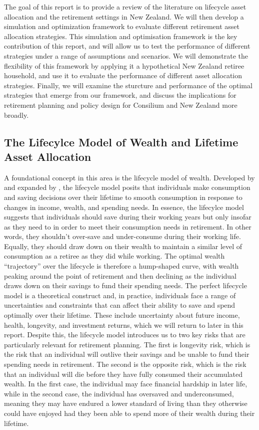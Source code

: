 \documentclass[11pt]{article}
\begin{document}
The goal of this report is to provide a review of the literature on lifecycle asset allocation and the retirement settings in New Zealand. We will then develop a simulation and optimization framework to evaluate different retirement asset allocation strategies. This simulation and optimisation framework is the key contribution of this report, and will allow us to test the performance of different strategies under a range of assumptions and scenarios. We will demonstrate the flexibility of this framework by applying it a hypothetical New Zealand retiree household, and use it to evaluate the performance of different asset allocation strategies. Finally, we will examine the sturcture and performance of the optimal strategies that emerge from our framework, and discuss the implications for retirement planning and policy design for Consilium and New Zealand more broadly.

\subsection{The Lifecylce Model of Wealth and Lifetime Asset Allocation}
\label{sec:glidepath_literature}

A foundational concept in this area is the lifecycle model of wealth. Developed by \textcite{modigliani1954utility} and expanded by \textcite{merton1969lifetime}, the lifecycle model posits that individuals make consumption and saving decisions over their lifetime to smooth consumption in response to changes in income, wealth, and spending needs. In essence, the lifecylce model suggests that individuals should save during their working years but only insofar as they need to in order to meet their consumption needs in retirement. In other words, they shouldn't over-save and under-consume during their working life. Equally, they should draw down on their wealth to maintain a similar level of consumption as a retiree as they did while working. The optimal wealth ``trajectory'' over the lifecycle is therefore a hump-shaped curve, with wealth peaking around the point of retirement and then declining as the individual draws down on their savings to fund their spending needs. The perfect lifecycle model is a theoretical construct and, in practice, individuals face a range of uncertainties and constraints that can affect their ability to save and spend optimally over their lifetime. These include uncertainty about future income, health, longevity, and investment returns, which we will return to later in this report. Despite this, the lifecycle model introduces us to two key risks that are particularly relevant for retirement planning. The first is longevity risk, which is the risk that an individual will outlive their savings and be unable to fund their spending needs in retirement. The second is the opposite risk, which is the risk that an individual will die before they have fully consumed their accumulated wealth. In the first case, the individual may face financial hardship in later life, while in the second case, the individual has oversaved and underconsumed, meaning they may have endured a lower standard of living than they otherwise could have enjoyed had they been able to spend more of their wealth during their lifetime. 
\end{document}
